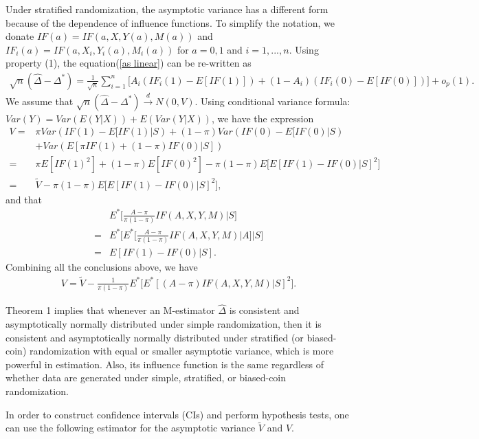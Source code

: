 \documentclass{article}
\begin{document}
Under stratified randomization, the asymptotic variance has a different form because of the dependence of influence functions. To simplify the notation, we donate $IF(a)=IF(a,X,Y(a),M(a))$ and $IF_i(a)=IF(a,X_i,Y_i(a),M_i(a))$ for $a=0,1$ and $i=1,...,n$. Using property (1), the equation(\ref{as linear}) can be re-written as
\begin{align}
    \sqrt{n}(\hat{\Delta} - \Delta^{*})=\frac{1}{\sqrt{n}}\sum_{i=1}^n \big[A_i(IF_i(1)-E[IF(1)])+(1-A_i)(IF_i(0)-E[IF(0)])\big]+o_p(1).\nonumber
\end{align}
We assume that $\sqrt{n}(\hat{\Delta} - \Delta^{*})\stackrel{d}{\rightarrow} N(0,V)$. Using conditional variance formula: $Var(Y) = Var(E(Y|X))+E(Var(Y|X))$, we have the expression
\begin{align}
    V=&\pi Var(IF(1)-E[IF(1)|S)+(1-\pi)Var(IF(0)-E[IF(0)|S)\nonumber\\
    &+Var(E[\pi IF(1)+(1-\pi)IF(0)|S])\nonumber\\
    =&\pi E[IF(1)^2]+(1-\pi)E[IF(0)^2]-\pi(1-\pi)E\big[E[IF(1)-IF(0)|S]^2\big]\nonumber\\
    =&\widetilde{V}-\pi(1-\pi)E\big[E[IF(1)-IF(0)|S]^2\big],\nonumber
\end{align}
and that
\begin{align}
    &E^*\Big[\frac{A-\pi}{\pi(1-\pi)}IF(A,X,Y,M)|S\Big]\nonumber\\
    =&E^*\Big[E^*\Big[\frac{A-\pi}{\pi(1-\pi)}IF(A,X,Y,M)|A\Big]|S\Big]\nonumber\\
    =&E[IF(1)-IF(0)|S].\nonumber
\end{align}
Combining all the conclusions above, we have
\begin{align}\label{var}
     V=\widetilde{V}-\frac{1}{\pi(1-\pi)}E^{*}\big[E^{*}[(A-\pi)IF(A,X,Y,M)|S]^2\big].
\end{align}

Theorem 1 implies that whenever an M-estimator $\hat{\Delta}$
is consistent and asymptotically normally distributed under simple randomization, then it is consistent and asymptotically normally distributed under stratified (or biased-coin) randomization with equal or smaller asymptotic variance, which is more powerful in estimation. Also, its influence function is the same regardless of whether data are generated under simple, stratified, or biased-coin randomization.

In order to construct confidence intervals (CIs) and perform
hypothesis tests, one can use the following estimator for the
asymptotic variance $\widetilde{V}$ and $V$. 
\end{document}
